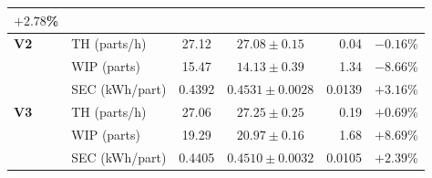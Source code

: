\documentclass[a4paper,fleqn]{cas-sc}
\begin{document}
\begin{table}[ ]
\begin{tabular}{@{}l l c c r r@{}}
  $+2.78$\% \\                                                                      
  \midrule                                                  
  \textbf{V2}      & TH (parts/h)   & 27.12  & $27.08 \pm 0.15$    & 0.04   &       
  $-0.16$\% \\                                                                      
                   & WIP (parts)    & 15.47  & $14.13 \pm 0.39$    & 1.34   &
  $-8.66$\% \\                                                                      
                   & SEC (kWh/part) & 0.4392 & $0.4531 \pm 0.0028$ & 0.0139 &
  $+3.16$\% \\                                                                      
  \midrule                                                  
  \textbf{V3}      & TH (parts/h)   & 27.06  & $27.25 \pm 0.25$    & 0.19   &       
  $+0.69$\% \\                                                                      
                   & WIP (parts)    & 19.29  & $20.97 \pm 0.16$    & 1.68   &
  $+8.69$\% \\                                                                      
                   & SEC (kWh/part) & 0.4405 & $0.4510 \pm 0.0032$ & 0.0105 &
  $+2.39$\% \\                                                                      
  \bottomrule                                               
  \end{tabular}                                                                     
  \end{table}          





















  
   
\end{document}
